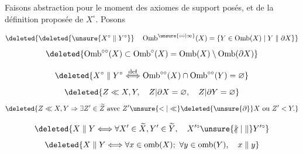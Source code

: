 
Faisons abstraction pour le moment des axiomes de support posés, et de la définition proposée de $X^\circ$. Posons

\[
\deleted{\deleted{\unsure{X^\circ\parallel Y^\circ}}\quad\operatorname{Omb}^{\unsure{\circ\circ|\infty}}(X)=\{Y\in\operatorname{Omb}(X)\mid Y\parallel\partial X\}}
\]
\[
\deleted{\operatorname{Omb}^{\circ\circ}(X)\subset\operatorname{Omb}^{\circ}(X)=\operatorname{Omb}(X)\setminus\operatorname{Omb}(\partial X)}
\]

\[
\deleted{X^\circ\parallel Y^\circ\overset{\mathrm{def}}{\Longleftrightarrow}\operatorname{Omb}^{\circ\circ}(X)\cap\operatorname{Omb}^{\circ\circ}(Y)=\varnothing}
\]
\[
\deleted{Z\ll X,Y,\quad Z|\partial X=\varnothing,\quad Z|\partial Y=\varnothing}
\]
\[
\deleted{Z\ll X,Y\Rightarrow\exists Z'\in\widetilde Z\ \text{avec}\ Z'\unsure{<|\ll}\deleted{\unsure{\partial}}X\ \text{ou}\ Z'<Y.}
\]

\[
\deleted{X\parallel Y\Longleftrightarrow\forall X'\in\widetilde X,Y'\in\widetilde Y,\quad X'^\circ\unsure{\nparallel|\parallel}Y'^\circ}
\]
\[
\deleted{X\parallel Y\Longleftrightarrow\forall x\in\operatorname{omb}(X);\ \forall y\in\operatorname{omb}(Y),\quad x\parallel y}
\]
